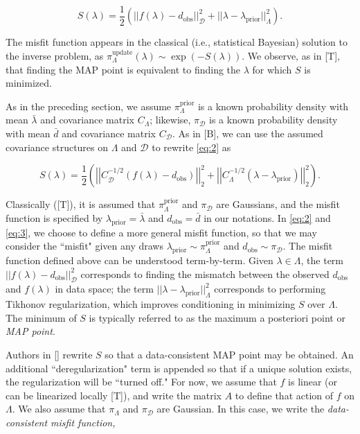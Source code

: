 \documentclass{amsart}
\begin{document}
\begin{equation} \label{eq:2}
S(\lambda)=\frac{1}{2}\left(||f(\lambda)-d_{\text{obs}}||_\mathcal{D}^2+||\lambda-\lambda_{\text{prior}}||_\Lambda^2\right).
\end{equation}

The misfit function appears in the classical (i.e., statistical Bayesian) solution to the inverse problem, as $\pi_\Lambda^\text{update}(\lambda) \sim \exp(-S(\lambda)).$ We observe, as in [T], that finding the MAP point is equivalent to finding the $\lambda$ for which $S$ is minimized.

As in the preceding section, we assume $\pi_\Lambda^\text{prior}$ is a known probability density with mean $\bar{\lambda}$ and covariance matrix $C_\Lambda$; likewise, $\pi_\mathcal{D}$ is a known probability density with mean $\bar{d}$ and covariance matrix $C_\mathcal{D}$. As in [B], we can use the assumed covariance structures on $\Lambda$ and $\mathcal{D}$ to rewrite \eqref{eq:2} as


\begin{equation} \label{eq:3}
S(\lambda)=\frac{1}{2}\left(\left|\left|C_\mathcal{D}^{-1/2}(f(\lambda)-d_{\text{obs}})\right|\right|_2^2+\left|\left|C_\Lambda^{-1/2}(\lambda-\lambda_{\text{prior}})\right|\right|_2^2\right).
\end{equation} 

Classically ([T]), it is assumed that $\pi_\Lambda^\text{prior}$ and $\pi_\mathcal{D}$ are Gaussians, and the misfit function is specified by $\lambda_{\text{prior}}=\bar{\lambda}$ and $d_{\text{obs}}=\bar{d}$ in our notations. In \eqref{eq:2} and \eqref{eq:3}, we choose to define a more general misfit function, so that we may consider the ``misfit" given any draws $\lambda_{\text{prior}}\sim \pi_\Lambda^\text{prior}$ and $d_\text{obs} \sim \pi_\mathcal{D}$. The misfit function defined above can be understood term-by-term. Given $\lambda \in \Lambda$, the term $||f(\lambda)-d_{\text{obs}}||_\mathcal{D}^2$ corresponds to finding the mismatch between the observed $d_\text{obs}$ and $f(\lambda)$ in data space; the term $||\lambda-\lambda_{\text{prior}}||_\Lambda^2$ corresponds to performing Tikhonov regularization, which improves conditioning in minimizing $S$ over $\Lambda$. The minimum of $S$ is typically referred to as the maximum a posteriori point or \textit{MAP point}.

Authors in [] rewrite $S$ so that a data-consistent MAP point may be obtained. An additional ``deregularization" term is appended so that if a unique solution exists, the regularization will be ``turned off." For now, we assume that $f$ is linear (or can be linearized locally [T]), and write the matrix $A$ to define that action of $f$ on $\Lambda$. We also assume that $\pi_\Lambda$ and $\pi_\mathcal{D}$ are Gaussian. In this case, we write the \textit{data-consistent misfit function,}
\end{document}
